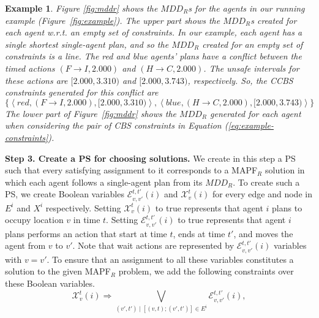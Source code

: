 \documentclass[review]{elsarticle}
\newtheorem{example}{Example}
\newcommand{\tuple}[1]{\ensuremath{\left \langle #1 \right \rangle }}
\newcommand{\mddr}{\ensuremath{MDD_R}\xspace}
\newcommand{\mddrs}{\ensuremath{MDD_R}s\xspace}
\newcommand\konstantin[1]{\nb{\textbf{Konstantin:}}{red}{#1}}
\newcommand\roni[1]{\nb{\textbf{Roni:}}{green}{#1}}
\newcommand{\ccbs}{\ac{CCBS}\xspace}
\newcommand{\cbs}{\ac{CBS}\xspace}
\newcommand{\ps}{\ac{PS}\xspace}
\newcommand{\mapfr}{\ac{MAPF}$_R$\xspace}
\begin{document}
\begin{example}
	Figure \ref{fig:mddr} shows the \mddrs for the agents in our running example (Figure~\ref{fig:example}). 
	The upper part shows the \mddrs created for each agent w.r.t. an empty set of constraints. 
	In our example, each agent has a single shortest single-agent plan, and so the \mddr 
	created for an empty set of constraints is a line. 
	The red and blue agents' plans have a conflict between the timed actions $(F\rightarrow I, 2.000)$ and $(H \rightarrow C, 2.000)$. 
	The unsafe intervals for these actions are $[2.000,3.310)$ and $[2.000,3.743)$, respectively. 
	So, the \ccbs constraints generated for this conflict are
	\begin{equation}
	\{ \tuple{red, (F\rightarrow I, 2.000), [2.000,3.310)}, 
	\tuple{blue, (H\rightarrow C, 2.000), [2.000,3.743)} \}
	\label{eq:example-constraints}
	\end{equation}
	The lower part of Figure~\ref{fig:mddr} shows the \mddr generated for each agent when considering the pair of \cbs constraints in Equation (\ref{eq:example-constraints}).
\end{example}




\textbf{Step 3. Create a \ps for choosing solutions.}
We create in this step a \ps such that every satisfying assignment to it corresponds to a \mapfr solution in which each agent follows a single-agent plan from its \mddr. 
To create such a \ps, we create Boolean variables $\mathcal{E}_{v,v'}^{t,t'}(i)$ and $\mathcal{X}_{v}^{t}(i)$ 
for every edge and node in $E^i$ and $X^i$ respectively. 
Setting $\mathcal{X}_v^t(i)$ to true represents that agent $i$ plans to occupy location $v$ in time $t$. 
Setting $\mathcal{E}_{v,v'}^{t,t'}(i)$ to true represents that agent $i$ plans performs an action that start at time $t$, ends at time $t'$, and moves the agent from $v$ to $v'$. 
Note that wait actions are represented by $\mathcal{E}_{v,v'}^{t,t'}(i)$ variables with $v=v'$. 
To ensure that an assignment to all these variables constitutes a solution to the given \mapfr problem, 
we add the following constraints over these Boolean variables. 
\begin{equation}
{  \mathcal{X}_v^t(i) \Rightarrow \bigvee_{(v',t')\;|\;[(v,t);(v',t')] \in E^i}{\mathcal{E}^{t,t'}_{v,v'}(i)},
}
\label{eq-1}
\end{equation}
\end{document}
